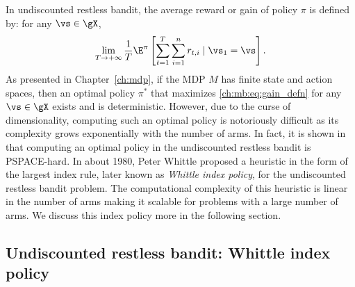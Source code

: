 In undiscounted restless bandit, the average reward or gain of policy $\pi$ is defined by: for any $\vs\in\gX$,
\begin{equation}
    \label{ch:mb:eq:gain_defn}
    \lim_{T\to+\infty}\frac1T \E^\pi\left[ \sum_{t=1}^{T} \sum_{i=1}^nr_{t,i} \mid \vs_1=\vs\right].
\end{equation}
As presented in Chapter~\ref{ch:mdp}, if the MDP $M$ has finite state and action spaces, then an optimal policy $\pi^*$ that maximizes \eqref{ch:mb:eq:gain_defn} for any $\vs\in\gX$ exists and is deterministic.
However, due to the curse of dimensionality, computing such an optimal policy is notoriously difficult as its complexity grows exponentially with the number of arms.
In fact, it is shown in \cite[Theorem~4]{papadimitriou1994complexity} that computing an optimal policy in the undiscounted restless bandit is PSPACE-hard.
In about 1980, Peter Whittle proposed a heuristic in the form of the largest index rule, later known as \emph{Whittle index policy}, for the undiscounted restless bandit problem.
The computational complexity of this heuristic is linear in the number of arms making it scalable for problems with a large number of arms.  
We discuss this index policy more in the following section.


\subsection{Undiscounted restless bandit: Whittle index policy}
\label{ch:mb:ssec:whittle_idx}


